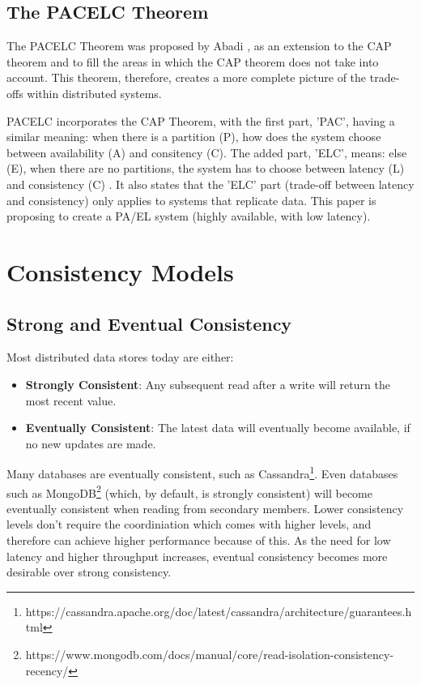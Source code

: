 \documentclass[12pt]{report}
\begin{document}
\subsection{The PACELC Theorem}
The PACELC Theorem was proposed by Abadi \cite{6127847}, as an extension to the CAP theorem and to fill the areas in which the CAP theorem does not take into account. This theorem, therefore, creates a more complete picture of the trade-offs within distributed systems. \par
PACELC incorporates the CAP Theorem, with the first part, 'PAC', having a similar meaning: when there is a partition (P), how does the system choose between availability (A) and consitency (C). The added part, 'ELC', means: else (E), when there are no partitions, the system has to choose between latency (L) and consistency (C) \cite{6127847}. It also states that the 'ELC' part (trade-off between latency and consistency) only applies to systems that replicate data. This paper is proposing to create a PA/EL \cite{6127847} system (highly available, with low latency).

\section{Consistency Models}
\subsection{Strong and Eventual Consistency}
Most distributed data stores today are either:
\begin{itemize}
    \item \textbf{Strongly Consistent}: Any subsequent read after a write will return the most recent value.
    \item \textbf{Eventually Consistent}: The latest data will eventually become available, if no new updates are made.
\end{itemize}
Many databases are eventually consistent, such as Cassandra\footnote{https://cassandra.apache.org/doc/latest/cassandra/architecture/guarantees.html}. Even databases such as MongoDB\footnote{https://www.mongodb.com/docs/manual/core/read-isolation-consistency-recency/} (which, by default, is strongly consistent) will become eventually consistent when reading from secondary members. Lower consistency levels don't require the coordiniation which comes with higher levels, and therefore can achieve higher performance because of this. As the need for low latency and higher throughput increases, eventual consistency becomes more desirable over strong consistency. \par
\end{document}
